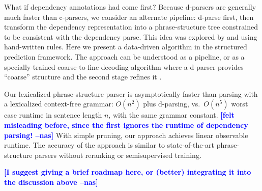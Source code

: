 \documentclass[11pt,letterpaper]{article}
\newcommand{\lpkcomment}[1]{\textcolor{red}{\bf \small [#1 --lpk]}}
\newcommand{\nascomment}[1]{\textcolor{blue}{\bf \small [#1 --nas]}}
\begin{document}
What if dependency annotations had come first?  Because d-parsers are
generally much faster than c-parsers, we consider an alternate
pipeline: d-parse first, then transform the dependency representation
into a phrase-structure tree constrained to be consistent with the
dependency parse.  This idea was explored by   and
 using hand-written rules.  Here we present a data-driven
algorithm in the structured prediction framework.  The approach can be
understood as a pipeline, or as a specially-trained coarse-to-fine
decoding algorithm where a d-parser provides ``coarse'' structure and
the second stage refines it \cite{??}.

Our lexicalized phrase-structure parser is
asymptotically faster than
  parsing with a lexicalized context-free grammar:  $O(n^2)$ plus
  d-parsing,
  vs.~$O(n^5)$ worst case runtime in sentence length $n$, with the same grammar constant.
  \nascomment{felt misleading before, since the first ignores the runtime of
    dependency parsing!}  With simple pruning, our approach achieves
  linear observable runtime.  The accuracy of the approach is similar
  to state-of-the-art phrase-structure parsers without reranking or
  semisupervised training.


\nascomment{I suggest giving a brief roadmap here, or (better) integrating it
  into the discussion above}




\end{document}

